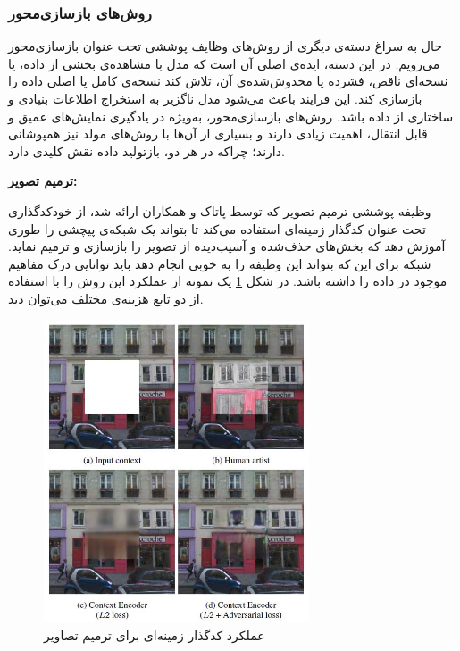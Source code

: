 \subsubsection{روش‌های بازسازی‌محور}

حال به سراغ دسته‌ی دیگری از روش‌های وظایف پوششی تحت عنوان بازسازی‌محور می‌رویم. در این دسته، ایده‌ی اصلی آن است که مدل با مشاهده‌ی بخشی از داده، یا نسخه‌ای ناقص، فشرده یا مخدوش‌شده‌ی آن، تلاش کند نسخه‌ی کامل یا اصلی داده را بازسازی کند. این فرایند باعث می‌شود مدل ناگزیر به استخراج اطلاعات بنیادی و ساختاری از داده باشد. روش‌های بازسازی‌محور، به‌ویژه در یادگیری نمایش‌های عمیق و قابل انتقال، اهمیت زیادی دارند و بسیاری از آن‌ها با روش‌های مولد نیز همپوشانی دارند؛ چراکه در هر دو، بازتولید داده نقش کلیدی دارد.\newline


\noindent\textbf{ترمیم تصویر:}

وظیفه پوششی ترمیم تصویر
که توسط پاتاک و همکاران\cite{pathak2016context}
ارائه شد، از خودکدگذاری تحت عنوان
کدگذار زمینه‌ای
استفاده می‌کند تا بتواند یک شبکه‌ی پیچشی را طوری آموزش دهد که بخش‌های حذف‌شده و آسیب‌دیده از تصویر را بازسازی و ترمیم نماید. شبکه برای این که بتواند این وظیفه را به خوبی انجام دهد باید توانایی درک مفاهیم موجود در داده را داشته باشد.
در شکل \ref{fig:inpainting-losses}
یک نمونه از عملکرد این روش را با استفاده از دو تابع هزینه‌ی مختلف می‌توان دید.

\begin{figure}[htb!]
\centering
\includegraphics[width=0.7\textwidth]{Images/Chapter2/inpainting-losses.png}
\caption{عملکرد کدگذار زمینه‌ای برای ترمیم تصاویر}
\label{fig:inpainting-losses}
\end{figure}

